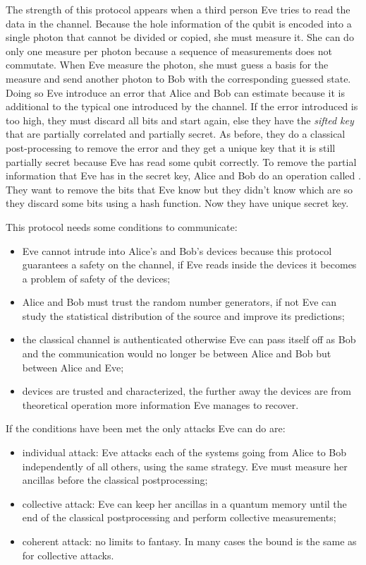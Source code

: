 The strength of this protocol appears when a third person Eve tries to read the data in the channel. Because the hole information of the qubit is encoded into a single photon that cannot be divided or copied, she must measure it. She can do only one measure per photon because a sequence of measurements does not commutate. When Eve measure the photon, she must guess a basis for the measure and send another photon to Bob with the corresponding guessed state. Doing so Eve introduce an error that Alice and Bob can estimate because it is additional to the typical one introduced by the channel. If the error introduced is too high, they must discard all bits and start again, else they have the \textit{sifted key} that are partially correlated and partially secret. As before, they do a classical post-processing to remove the error and they get a unique key that it is still partially secret because Eve has read some qubit correctly. To remove the partial information that Eve has in the secret key, Alice and Bob do an operation called . They want to remove the bits that Eve know but they didn't know which are so they discard some bits using a hash function. Now they have unique secret key.

This protocol needs some conditions to communicate:
\begin{itemize}
  \item Eve cannot intrude into Alice’s and Bob’s devices because this protocol guarantees a safety on the channel, if Eve reads inside the devices it becomes a problem of safety of the devices;
  \item Alice and Bob must trust the random number generators, if not Eve can study the statistical distribution of the source and improve its predictions;
  \item the classical channel is authenticated otherwise Eve can pass itself off as Bob and the communication would no longer be between Alice and Bob but between Alice and Eve;
  \item devices are trusted and characterized, the further away the devices are from theoretical operation more information Eve manages to recover.
\end{itemize}

If the conditions have been met the only attacks Eve can do are:
\begin{itemize}
  \item individual attack: Eve attacks each of the systems going from Alice to Bob independently of all others, using the same strategy. Eve must measure her ancillas before the classical postprocessing;
  \item collective attack: Eve can keep her ancillas in a quantum memory until the end of the classical postprocessing and perform collective measurements;
  \item coherent attack: no limits to fantasy. In many cases the bound is the same as for collective attacks.
\end{itemize}

